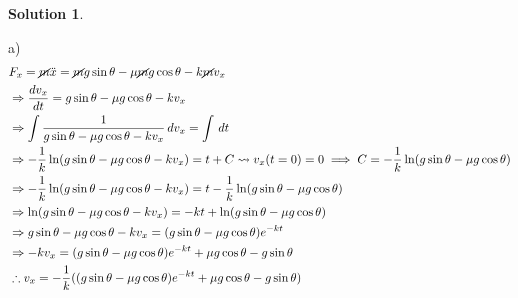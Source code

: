 \documentclass[10pt]{article}
\theoremstyle{definition}
\newtheorem{soln}{Solution}
\begin{document}
\begin{soln}
\begin{center}
\begin{tikzpicture}
          \end{tikzpicture}
     \end{center}
     a)
     \begin{align*}
           & F_x=\cancel{m}\ddot{x}=\cancel{m}g\sin\theta-\mu \cancel{m}g\cos\theta - k\cancel{m}v_x                                                                      \\
           & \Rightarrow \frac{dv_x}{dt}=g\sin\theta-\mu g\cos\theta - kv_x                                                                                               \\
           & \Rightarrow \int \frac{1}{g\sin\theta-\mu g\cos\theta - kv_x}\,dv_x= \int  \,dt                                                                              \\
           & \Rightarrow -\frac{1}{k}\ln(g\sin\theta-\mu g\cos\theta - kv_x) = t + C \rightsquigarrow v_x(t=0)=0 \implies C=-\frac{1}{k}\ln(g\sin\theta-\mu g \cos\theta) \\
           & \Rightarrow -\frac{1}{k}\ln(g\sin\theta-\mu g\cos\theta - kv_x) = t - \frac{1}{k}\ln(g\sin\theta-\mu g \cos\theta)                                           \\
           & \Rightarrow \ln(g\sin\theta-\mu g\cos\theta - kv_x) = -kt + \ln(g\sin\theta-\mu g \cos\theta)                                                                \\
           & \Rightarrow g\sin\theta-\mu g\cos\theta - kv_x = (g\sin\theta-\mu g \cos\theta)e^{-kt}                                                                       \\
           & \Rightarrow - kv_x = (g\sin\theta-\mu g \cos\theta)e^{-kt} + \mu g\cos\theta -g\sin\theta                                                                    \\
           & \therefore v_x = -\frac{1}{k}((g\sin\theta-\mu g \cos\theta)e^{-kt} + \mu g\cos\theta -g\sin\theta)                                                          \\
     \end{align*}


\end{soln}
\end{document}
